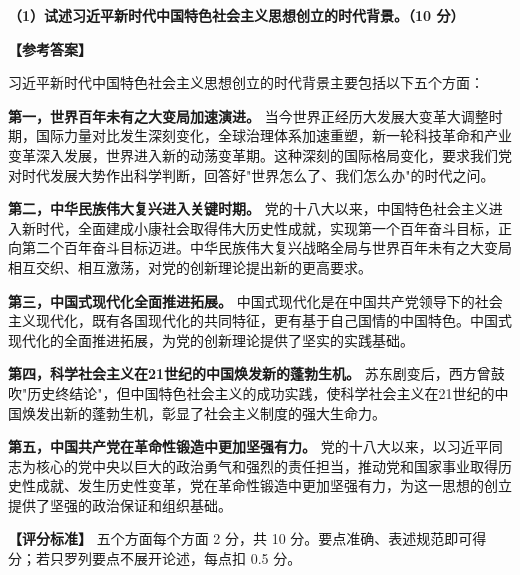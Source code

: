 \documentclass[12pt, a4paper]{article}
\begin{document}
\begin{answerbox}
\textbf{（1）试述习近平新时代中国特色社会主义思想创立的时代背景。（10 分）}

\textbf{【参考答案】}

习近平新时代中国特色社会主义思想创立的时代背景主要包括以下五个方面：

\textbf{第一，世界百年未有之大变局加速演进。} 当今世界正经历大发展大变革大调整时期，国际力量对比发生深刻变化，全球治理体系加速重塑，新一轮科技革命和产业变革深入发展，世界进入新的动荡变革期。这种深刻的国际格局变化，要求我们党对时代发展大势作出科学判断，回答好"世界怎么了、我们怎么办"的时代之问。

\textbf{第二，中华民族伟大复兴进入关键时期。} 党的十八大以来，中国特色社会主义进入新时代，全面建成小康社会取得伟大历史性成就，实现第一个百年奋斗目标，正向第二个百年奋斗目标迈进。中华民族伟大复兴战略全局与世界百年未有之大变局相互交织、相互激荡，对党的创新理论提出新的更高要求。

\textbf{第三，中国式现代化全面推进拓展。} 中国式现代化是在中国共产党领导下的社会主义现代化，既有各国现代化的共同特征，更有基于自己国情的中国特色。中国式现代化的全面推进拓展，为党的创新理论提供了坚实的实践基础。

\textbf{第四，科学社会主义在21世纪的中国焕发新的蓬勃生机。} 苏东剧变后，西方曾鼓吹"历史终结论"，但中国特色社会主义的成功实践，使科学社会主义在21世纪的中国焕发出新的蓬勃生机，彰显了社会主义制度的强大生命力。

\textbf{第五，中国共产党在革命性锻造中更加坚强有力。} 党的十八大以来，以习近平同志为核心的党中央以巨大的政治勇气和强烈的责任担当，推动党和国家事业取得历史性成就、发生历史性变革，党在革命性锻造中更加坚强有力，为这一思想的创立提供了坚强的政治保证和组织基础。

\textbf{【评分标准】} 五个方面每个方面 2 分，共 10 分。要点准确、表述规范即可得分；若只罗列要点不展开论述，每点扣 0.5 分。
\end{answerbox}
\end{document}

